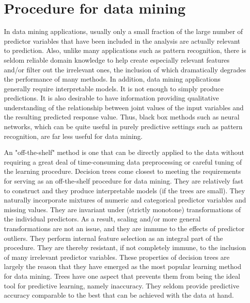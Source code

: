 \documentclass[12pt, letterpaper]{article}
\theoremstyle{definition}
\begin{document}
\section{Procedure for data mining}
In data mining applications, usually only a small fraction of the large number of predictor variables that have been included in the analysis are actually relevant to prediction. Also, unlike many applications such as pattern recognition, there is seldom reliable domain knowledge to help create especially relevant features and/or filter out the irrelevant ones, the inclusion of which dramatically degrades the performance of many methods.
In addition, data mining applications generally require interpretable models. It is not enough to simply produce predictions. It is also desirable to have information providing qualitative understanding of the relationship between joint values of the input variables and the resulting predicted response value. Thus, black box methods such as neural networks, which can be quite useful in purely predictive settings such as pattern recognition, are far less useful for data mining.

An "off-the-shelf" method is one that can be directly applied to the data without requiring a great deal of time-consuming data preprocessing or careful tuning of the learning procedure. Decision trees come closest to meeting the requirements for serving as an off-the-shelf procedure for data mining. They are relatively fast to construct and they produce interpretable models (if the trees are small). They naturally incorporate mixtures of numeric and categorical predictor variables and missing values. They are invariant under (strictly monotone) transformations of the individual predictors. As a result, scaling and/or more general transformations are not an issue, and they are immune to the effects of predictor outliers. They perform internal feature selection as an integral part of the procedure. They are thereby resistant, if not completely immune, to the inclusion of many irrelevant predictor variables. These properties of decision trees are largely the reason that they have emerged as the most popular learning method for data mining. Trees have one aspect that prevents them from being the ideal tool for predictive learning, namely inaccuracy. They seldom provide predictive accuracy comparable to the best that can be achieved with the data at hand.
\end{document}
